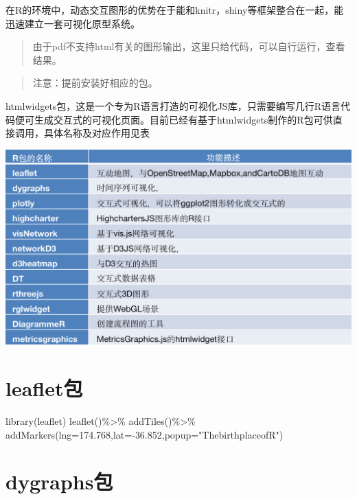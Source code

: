 \documentclass[
]{book}
\newenvironment{Shaded}{\begin{snugshade}}{\end{snugshade}}
\newcommand{\AttributeTok}[1]{\textcolor[rgb]{0.77,0.63,0.00}{#1}}
\newcommand{\FloatTok}[1]{\textcolor[rgb]{0.00,0.00,0.81}{#1}}
\newcommand{\FunctionTok}[1]{\textcolor[rgb]{0.00,0.00,0.00}{#1}}
\newcommand{\NormalTok}[1]{#1}
\newcommand{\SpecialCharTok}[1]{\textcolor[rgb]{0.00,0.00,0.00}{#1}}
\newcommand{\StringTok}[1]{\textcolor[rgb]{0.31,0.60,0.02}{#1}}
\begin{document}
在R的环境中，动态交互图形的优势在于能和knitr，shiny等框架整合在一起，能迅速建立一套可视化原型系统。

\begin{quote}
由于pdf不支持html有关的图形输出，这里只给代码，可以自行运行，查看结果。
\end{quote}

\begin{quote}
注意：提前安装好相应的包。
\end{quote}

htmlwidgets包，这是一个专为R语言打造的可视化JS库，只需要编写几行R语言代码便可生成交互式的可视化页面。目前已经有基于htmlwidgets制作的R包可供直接调用，具体名称及对应作用见表

\includegraphics{figure/24.png}

\hypertarget{leafletux5305}{%
\section{leaflet包}\label{leafletux5305}}

\begin{Shaded}
\begin{Highlighting}[]
\FunctionTok{library}\NormalTok{(leaflet)}
\FunctionTok{leaflet}\NormalTok{()}\SpecialCharTok{\%\textgreater{}\%}
  \FunctionTok{addTiles}\NormalTok{()}\SpecialCharTok{\%\textgreater{}\%}
  \FunctionTok{addMarkers}\NormalTok{(}\AttributeTok{lng=}\FloatTok{174.768}\NormalTok{,}\AttributeTok{lat=}\SpecialCharTok{{-}}\FloatTok{36.852}\NormalTok{,}\AttributeTok{popup=}\StringTok{"ThebirthplaceofR"}\NormalTok{)}
\end{Highlighting}
\end{Shaded}

\hypertarget{dygraphsux5305}{%
\section{dygraphs包}\label{dygraphsux5305}}
\end{document}
